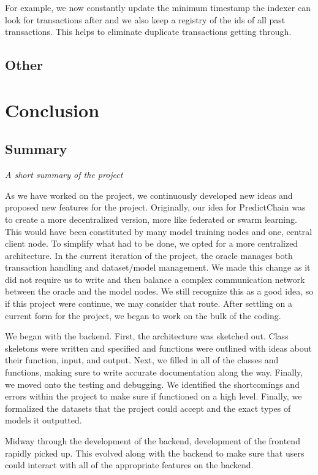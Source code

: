 \documentclass{article}
\begin{document}
    For example, we now constantly update the minimum timestamp the indexer can look for transactions after and we also
    keep a registry of the ids of all past transactions.  This helps to eliminate duplicate transactions getting through.

    \subsection{Other}

    \section{Conclusion}

    \subsection{Summary}
    \emph{A short summary of the project}

    As we have worked on the project, we continuously developed new ideas and proposed new features for the project.
    Originally, our idea for PredictChain was to create a more decentralized version, more like federated or swarm learning.
    This would have been constituted by many model training nodes and one, central client node.  To simplify what had to
    be done, we opted for a more centralized architecture.  In the current iteration of the project, the oracle manages
    both transaction handling and dataset/model management.  We made this change as it did not require us to write and then
    balance a complex communication network between the oracle and the model nodes.  We still recognize this as a good idea,
    so if this project were continue, we may consider that route.  After settling on a current form for the project, we
    began to work on the bulk of the coding.

    We began with the backend.  First, the architecture was sketched out.  Class skeletons were written and
    specified and functions were outlined with ideas about their function, input, and output.  Next, we filled in all of the
    classes and functions, making sure to write accurate documentation along the way.  Finally, we moved onto the testing
    and debugging.  We identified the shortcomings and errors within the project to make sure if functioned on a high
    level.  Finally, we formalized the datasets that the project could accept and the exact types of models it outputted.

    Midway through the development of the backend, development of the frontend rapidly picked up.  This evolved along
    with the backend to make sure that users could interact with all of the appropriate features on the backend.
\end{document}
